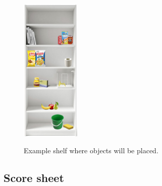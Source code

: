 \begin{figure}
  \centering
  \includegraphics[width=0.25\textwidth]{images/storing_groceries.png}
  \vspace{-10pt}
  \label{fig:storing_groceries}
  \caption{Example shelf where objects will be placed.}
\end{figure}

\newpage
\subsection{Score sheet}


